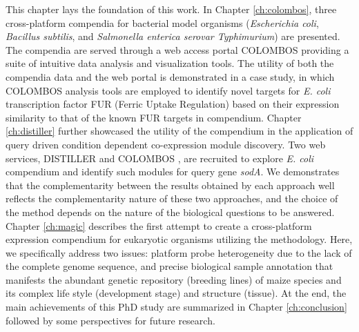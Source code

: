 %
%
This chapter lays the foundation of this work.
%
%
%
In Chapter \ref{ch:colombos}, three cross-platform compendia for bacterial
model organisms (\textit{Escherichia coli}, \textit{Bacillus subtilis}, and
\textit{Salmonella enterica serovar Typhimurium}) are presented.
%
The compendia are served through a web access portal COLOMBOS providing a
suite of intuitive data analysis and visualization tools.
%
The utility of both the compendia data and the web portal is demonstrated
in a case study, in which COLOMBOS analysis tools are employed to identify
novel targets for \textit{E. coli} transcription factor FUR (Ferric Uptake
Regulation) based on their expression similarity to that of the known FUR
targets in compendium.
%
Chapter \ref{ch:distiller} further showcased the utility of the compendium
in the application of query driven condition dependent co-expression module
discovery.
%
Two web services, DISTILLER \cite{Lemmens2009} and COLOMBOS
\cite{Engelen2011}, are recruited to explore \textit{E. coli}
compendium and identify such modules for query gene \textit{sodA}.
%
We demonstrates that the complementarity between the results obtained by
each approach well reflects the complementarity nature of these two
approaches, and the choice of the method depends on the nature of the
biological questions to be answered.
%
%
%
Chapter \ref{ch:magic} describes the first attempt to create a
cross-platform expression compendium for eukaryotic organisms utilizing the
methodology.
%
Here, we specifically address two issues: platform probe heterogeneity due
to the lack of the complete genome sequence, and precise biological sample
annotation that manifests the abundant genetic repository (breeding lines)
of maize species and its complex life style (development stage) and
structure (tissue).
%
%
%
At the end, the main achievements of this PhD study are summarized in
Chapter \ref{ch:conclusion} followed by some perspectives for future
research.




\cleardoublepage

